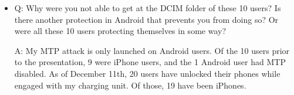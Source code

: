\documentclass[11pt]{article} %
\begin{document}
\begin{itemize}
A: Researchers speculate that this type of attack has not been launched in any substantial form to date. In 2011, a Defcon participant presented a malicious charger at the hacking conference, and saw 360 self-labeled ``hackers'' use the charging station over the course of a week\footnote{Beware of Juice-Jacking, \url{http://krebsonsecurity.com/2011/08/beware-of-juice-jacking/}}. 

\item Q: Why were you not able to get at the DCIM folder of these 10 users? Is there another protection in Android that prevents you from doing so? Or were all these 10 users protecting themselves in some way?

A: My MTP attack is only launched on Android users. Of the 10 users prior to the presentation, 9 were iPhone users, and the 1 Android user had MTP disabled. As of December 11th, 20 users have unlocked their phones while engaged with my charging unit. Of those, 19 have been iPhones. 

\end{itemize} 
\end{document}
